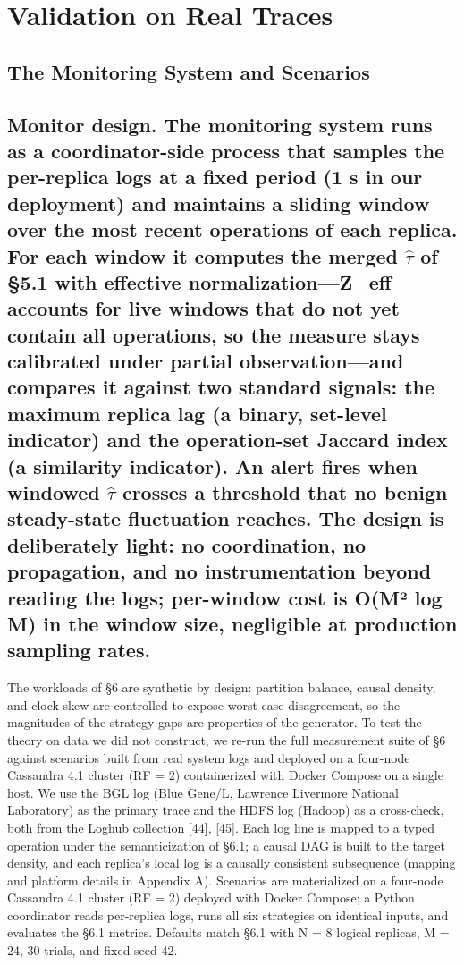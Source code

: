\documentclass[journal]{IEEEtran}
\begin{document}
\section{Validation on Real Traces}
\subsection{The Monitoring System and Scenarios}
\subsection{Monitor design. The monitoring system runs as a coordinator-side process that samples the per-replica logs at a fixed period (1 s in our deployment) and maintains a sliding window over the most recent operations of each replica. For each window it computes the merged $\hat{\tau}$ of §5.1 with effective normalization—Z\_eff accounts for live windows that do not yet contain all operations, so the measure stays calibrated under partial observation—and compares it against two standard signals: the maximum replica lag (a binary, set-level indicator) and the operation-set Jaccard index (a similarity indicator). An alert fires when windowed $\hat{\tau}$ crosses a threshold that no benign steady-state fluctuation reaches. The design is deliberately light: no coordination, no propagation, and no instrumentation beyond reading the logs; per-window cost is O(M² log M) in the window size, negligible at production sampling rates.}
The workloads of §6 are synthetic by design: partition balance, causal density, and clock skew are controlled to expose worst-case disagreement, so the magnitudes of the strategy gaps are properties of the generator. To test the theory on data we did not construct, we re-run the full measurement suite of §6 against scenarios built from real system logs and deployed on a four-node Cassandra 4.1 cluster (RF = 2) containerized with Docker Compose on a single host. We use the BGL log (Blue Gene/L, Lawrence Livermore National Laboratory) as the primary trace and the HDFS log (Hadoop) as a cross-check, both from the Loghub collection [44], [45]. Each log line is mapped to a typed operation under the semanticization of §6.1; a causal DAG is built to the target density, and each replica's local log is a causally consistent subsequence (mapping and platform details in Appendix A). Scenarios are materialized on a four-node Cassandra 4.1 cluster (RF = 2) deployed with Docker Compose; a Python coordinator reads per-replica logs, runs all six strategies on identical inputs, and evaluates the §6.1 metrics. Defaults match §6.1 with N = 8 logical replicas, M = 24, 30 trials, and fixed seed 42.
\end{document}
